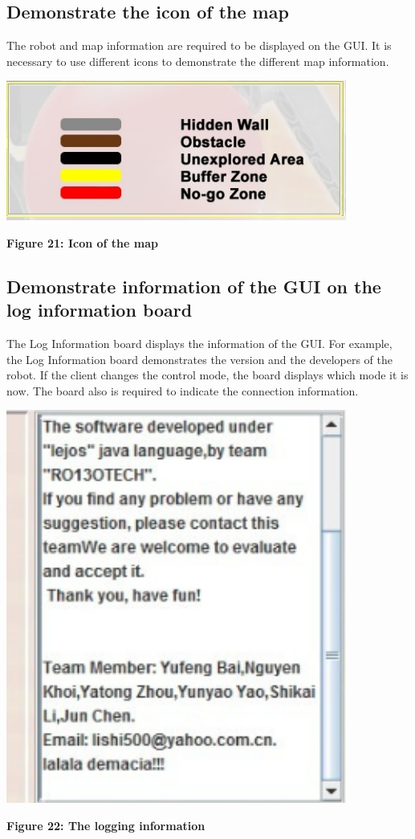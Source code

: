 \documentclass[11pt, a4paper]{report}
\begin{document}
\subsection{Demonstrate the icon of the map}
The robot and map information are required to be displayed on the GUI. It is necessary to use different icons to demonstrate the different map information.
  \begin{center}
 \includegraphics[width=11.20cm]{IconInformation.jpg}
\end{center}
\begin{center}
\textbf {Figure 21: Icon of the map} \\[0.3cm]
\end{center}
\subsection{Demonstrate information of the GUI on the log information board}
The Log Information board displays the information of the GUI. For example, the Log Information board demonstrates the version and the developers of the robot. If the client changes the control mode, the board displays which mode it is now. The board also is required to indicate the connection information.
  \begin{center}
 \includegraphics[width=11.20cm]{board}
\end{center}
\begin{center}
\textbf {Figure 22: The logging information} \\[0.3cm]
\end{center}
\end{document}
